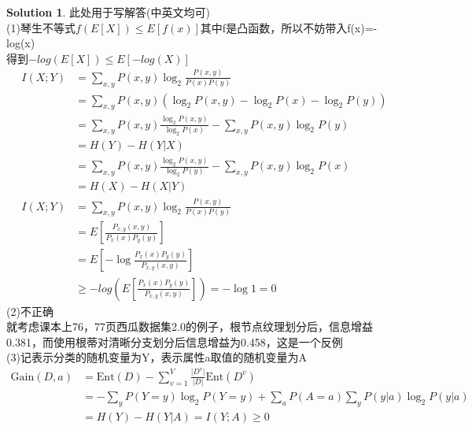\documentclass[a4paper,UTF8]{article}
\numberwithin{equation}{section}
\theoremstyle{definition}
\newtheorem*{solution}{Solution}
\begin{document}
\begin{solution}
此处用于写解答(中英文均可)
~\\
(1)琴生不等式$f(E[X]) \leq E[f(x)]$其中f是凸函数，所以不妨带入f(x)=-log(x)\\
得到$-log(E[X]) \leq E[-log(X)]$\\
\begin{align*}
	I(X;Y) &= \sum_{x,y} P(x,y) \log_2 \frac{P(x,y)}{P(x)P(y)}\\
	&= \sum_{x,y} P(x,y)(\log_2 P(x,y)-\log_2 P(x)-\log_2 P(y))\\
	&=\sum_{x,y} P(x,y)\frac{\log_2 P(x,y)}{\log_2 P(x)}-\sum_{x,y} P(x,y)\log_2 P(y)\\
	&=H(Y)-H(Y|X)\\
	&=\sum_{x,y} P(x,y)\frac{\log_2 P(x,y)}{\log_2 P(y)}-\sum_{x,y} P(x,y)\log_2 P(x)\\
	&=H(X)-H(X|Y)\\
	I(X;Y) &= \sum_{x,y} P(x,y) \log_2 \frac{P(x,y)}{P(x)P(y)}\\
	&=E[\frac{P_{x,y}(x,y)}{P_x(x)P_y(y)}]\\
	&=E[-\log \frac{P_x(x)P_y(y)}{P_{x,y}(x,y)}]\\
	&\geq -log (E[\frac{P_x(x)P_y(y)}{P_{x,y}(x,y)}])=-\log 1=0
\end{align*}
(2)不正确\\
就考虑课本上76，77页西瓜数据集2.0的例子，根节点纹理划分后，信息增益0.381，而使用根蒂对清晰分支划分后信息增益为0.458，这是一个反例\\
(3)记表示分类的随机变量为Y，表示属性a取值的随机变量为A\\
\begin{align*}
	\text{Gain}(D,a) &= \text{Ent}(D) - \sum_{v=1}^V \frac{\lvert D^v\rvert}{\lvert D \rvert} \text{Ent}(D^v)\\
	&=-\sum_{y}P(Y=y)\log_2 P(Y=y)+\sum_{a}P(A=a)\sum_{y}P(y|a)\log_2 P(y|a)\\
	&=H(Y)-H(Y|A)=I(Y;A) \geq 0
\end{align*}
~\\
\end{solution}

\newpage
\end{document}

